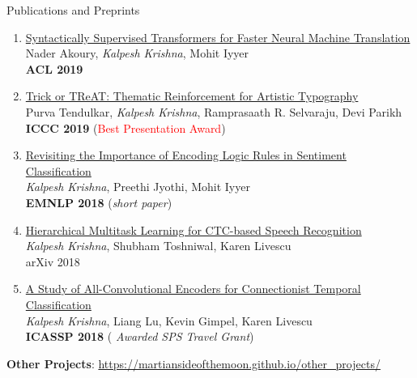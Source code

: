 \documentclass{resume} %
\begin{document}
\begin{rSection}{Publications and Preprints}
\begin{enumerate}[leftmargin=*]
\item \href{https://arxiv.org/abs/1906.02780}{Syntactically Supervised Transformers for Faster Neural Machine Translation} \\ Nader Akoury, \textit{Kalpesh Krishna}, Mohit Iyyer \\ \textbf{ACL 2019}
\item \href{https://arxiv.org/abs/1903.07820}{Trick or TReAT: Thematic Reinforcement for Artistic Typography} \\ Purva Tendulkar, \textit{Kalpesh Krishna}, Ramprasaath R. Selvaraju, Devi Parikh \\ \textbf{ICCC 2019} (\textcolor{red}{Best Presentation Award})
\item \href{https://arxiv.org/abs/1808.07733}{Revisiting the Importance of Encoding Logic Rules in Sentiment Classification} \\ \textit{Kalpesh Krishna}, Preethi Jyothi, Mohit Iyyer \\ \textbf{EMNLP 2018} (\textit{short paper})
\item \href{https://arxiv.org/abs/1807.06234}{Hierarchical Multitask Learning for CTC-based Speech Recognition} \\ \textit{Kalpesh Krishna}, Shubham Toshniwal, Karen Livescu \\
arXiv 2018
\item \href{https://arxiv.org/abs/1710.10398}{A Study of All-Convolutional Encoders for Connectionist Temporal Classification}\\ \textit{Kalpesh Krishna}, Liang Lu, Kevin Gimpel,  Karen Livescu\\ \textbf{ICASSP 2018} ({ \textit{Awarded SPS Travel Grant}})
%
\end{enumerate}

\textbf{Other Projects}: \url{https://martiansideofthemoon.github.io/other_projects/}
\end{rSection}

\pagebreak
\end{document}

